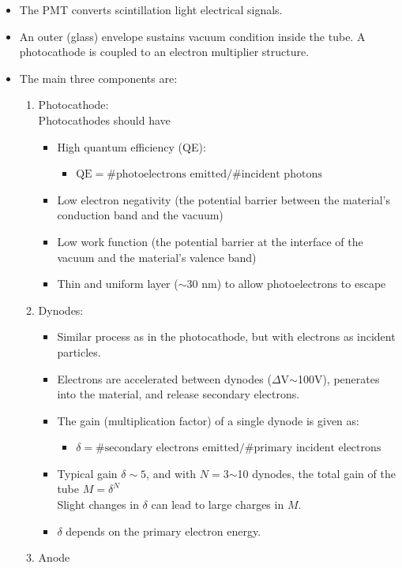 \begin{itemize}
    \item The PMT converts scintillation light electrical signals.
    \item An outer (glass) envelope sustains vacuum condition inside the tube. A photocathode is coupled to an electron multiplier structure. 
    \item The main three components are:
    \begin{enumerate}
        \item Photocathode:\\
        Photocathodes should have
        \begin{itemize}
            \item High quantum efficiency (QE): 
            \begin{itemize}
                \item[] $\text{QE}=\text{\# photoelectrons emitted}/\text{\# incident photons}$
            \end{itemize}
            \item Low electron negativity (the potential barrier between the material's conduction band and the vacuum)
            \item Low work function (the potential barrier at the interface of the vacuum and the material's valence band)
            \item Thin and uniform layer ($\sim$30 nm) to allow photoelectrons to escape
        \end{itemize}
        \item Dynodes:
        \begin{itemize}
            \item Similar process as in the photocathode, but with electrons as incident particles. 
            \item Electrons are accelerated between dynodes ($\Delta$V$\sim$100V), penerates into the material, and release secondary electrons. 
            \item The gain (multiplication factor) of a single dynode is given as:
            \begin{itemize}
                \item[] $\delta=\text{\# secondary electrons emitted}/\text{\# primary incident electrons}$
            \end{itemize}
            \item Typical gain $\delta\sim5$, and with $N=$3$\sim$10 dynodes, the total gain of the tube $M=\delta^N$\\
            Slight changes in $\delta$ can lead to large charges in $M$.
            \item $\delta$ depends on the primary electron energy.
        \end{itemize}
        \item Anode
    \end{enumerate}
\end{itemize}

